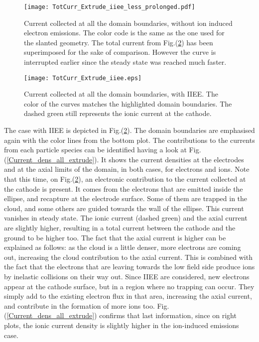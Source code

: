 \begin{figure}[h!]
\centering
	\texttt{[image: TotCurr\_Extrude\_iiee\_less\_prolonged.pdf]}
	\caption{\label{TotCurr_Extrude_iiee_less} Current collected at all the domain boundaries, without ion induced electron emissions. The color code is the same as the one used for the slanted geometry. The total current from Fig.(\ref{TotCurr_Extrude_iiee}) has been superimposed for the sake of comparison. However the curve is interrupted earlier since the steady state was reached much faster.}
\end{figure}

\begin{figure}[h!]
\centering
	\texttt{[image: TotCurr\_Extrude\_iiee.eps]}
	\caption{\label{TotCurr_Extrude_iiee} Current collected at all the domain boundaries, with IIEE. The color of the curves matches the highlighted domain boundaries. The dashed green still represents the ionic current at the cathode.  }
\end{figure}

\noindent The case with IIEE is depicted in Fig.(\ref{TotCurr_Extrude_iiee}). The domain boundaries are emphasised again with the color lines from the bottom plot. The contributions to the currents from each particle species can be identified having a look at Fig.(\ref{Current_dens_all_extrude}). It shows the current densities at the electrodes and at the axial limits of the domain, in both cases, for electrons and ions. Note that this time, on Fig.(\ref{TotCurr_Extrude_iiee}), an electronic contribution to the current collected at the cathode is present. It comes from the electrons that are emitted inside the ellipse, and recapture at the electrode surface. Some of them are trapped in the cloud, and some others are guided towards the wall of the ellipse. This current vanishes in steady state. The ionic current (dashed green) and the axial current are slightly higher, resulting in a total current between the cathode and the ground to be higher too. The fact that the axial current is higher can be explained as follows: as the cloud is a little denser, more electrons are coming out, increasing the cloud contribution to the axial current. This is combined with the fact that the electrons that are leaving towards the low field side produce ions by inelastic collisions on their way out. Since IIEE are considered, new electrons appear at the cathode surface, but in a region where no trapping can occur. They simply add to the existing electron flux in that area, increasing the axial current, and contribute in the formation of more ions too. Fig.(\ref{Current_dens_all_extrude}) confirms that last information, since on right plots, the ionic current density is slightly higher in the ion-induced emissions case. \\

